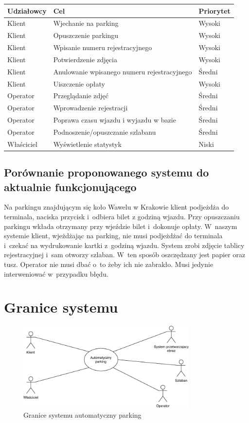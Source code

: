 \begin{table}[H]
	\begin{tabular}{|l|l|l|} \hline
	\textbf{Udziałowcy}	& \textbf{Cel} & \textbf{Priorytet} \\ \hline%
	Klient	& Wjechanie na parking & Wysoki \\
	Klient	& Opuszczenie parkingu & Wysoki \\
	Klient	& Wpisanie numeru rejestracyjnego & Wysoki \\
	Klient	& Potwierdzenie zdjęcia & Wysoki \\
	Klient	& Anulowanie wpisanego numeru rejestracyjnego & Średni \\
	Klient	& Uiszczenie opłaty & Wysoki \\
	Operator& Przeglądanie zdjęć & Średni \\
	Operator& Wprowadzenie rejestracji & Średni \\
	Operator& Poprawa czasu wjazdu i wyjazdu w bazie & Średni \\
	Operator& Podnoszenie/opuszczanie szlabanu & Średni \\
	Właściciel& Wyświetlenie statystyk & Niski \\ \hline
	\end{tabular}
\end{table}

\subsection{Porównanie proponowanego systemu do aktualnie funkcjonującego}
Na parkingu znajdującym się koło Wawelu w Krakowie klient podjeżdża do terminala, naciska przycisk i~odbiera bilet z godziną wjazdu. Przy opuszczaniu parkingu wkłada otrzymany przy wjeździe bilet i~dokonuje opłaty.
W~naszym systemie klient, wjeżdżając na parking, nie musi podjeżdżać do terminala i~czekać na wydrukowanie kartki z~godziną wjazdu. System zrobi zdjęcie tablicy rejestracyjnej i~sam otworzy szlaban. W~ten sposób oszczędzany jest papier oraz tusz. Operator nie musi dbać o~to żeby ich nie zabrakło. Musi jedynie interweniować w~przypadku błędu.


\section{Granice systemu}
\begin{figure}[H]
	\centering
	\includegraphics[width=90mm]{diagramy/graniceSystemu.pdf}
	\caption{Granice systemu automatyczny parking \label{overflow}}
\end{figure}

